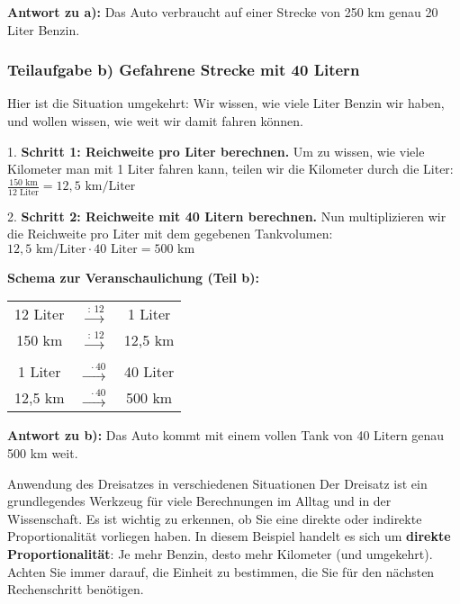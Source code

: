 \begin{loesungsumgebung}[loes:2.2]{}
\textbf{Antwort zu a):} Das Auto verbraucht auf einer Strecke von 250 km genau 20 Liter Benzin.

\subsubsection*{Teilaufgabe b) Gefahrene Strecke mit 40 Litern}

Hier ist die Situation umgekehrt: Wir wissen, wie viele Liter Benzin wir haben, und wollen wissen, wie weit wir damit fahren können.

1.  \textbf{Schritt 1: Reichweite pro Liter berechnen.}
    Um zu wissen, wie viele Kilometer man mit 1 Liter fahren kann, teilen wir die Kilometer durch die Liter:
    $\frac{150 \text{ km}}{12 \text{ Liter}} = 12,5 \text{ km/Liter}$

2.  \textbf{Schritt 2: Reichweite mit 40 Litern berechnen.}
    Nun multiplizieren wir die Reichweite pro Liter mit dem gegebenen Tankvolumen:
    $12,5 \text{ km/Liter} \cdot 40 \text{ Liter} = 500 \text{ km}$

\textbf{Schema zur Veranschaulichung (Teil b):}

\begin{center}
\begin{tabular}{c c c}
    12 Liter & $\xrightarrow{\text{ : } 12}$ & 1 Liter \\
    150 km & $\xrightarrow{\text{ : } 12}$ & 12,5 km \\
    \quad \\
    1 Liter & $\xrightarrow{\text{ } \cdot 40}$ & 40 Liter \\
    12,5 km & $\xrightarrow{\text{ } \cdot 40}$ & 500 km \\
\end{tabular}
\end{center}

\textbf{Antwort zu b):} Das Auto kommt mit einem vollen Tank von 40 Litern genau 500 km weit.

\begin{warumwichtigumgebung}{Anwendung des Dreisatzes in verschiedenen Situationen}
Der Dreisatz ist ein grundlegendes Werkzeug für viele Berechnungen im Alltag und in der Wissenschaft. Es ist wichtig zu erkennen, ob Sie eine direkte oder indirekte Proportionalität vorliegen haben. In diesem Beispiel handelt es sich um \textbf{direkte Proportionalität}: Je mehr Benzin, desto mehr Kilometer (und umgekehrt). Achten Sie immer darauf, die Einheit zu bestimmen, die Sie für den nächsten Rechenschritt benötigen.
\end{warumwichtigumgebung}

\end{loesungsumgebung}

